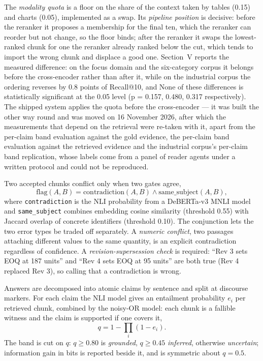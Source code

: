 \documentclass[conference]{IEEEtran}
\begin{document}
The \emph{modality quota} is a floor on the share of the context taken by
tables (0.15) and charts (0.05), implemented as a swap. Its
\emph{pipeline position} is decisive: before the reranker it proposes a
membership for the final ten, which the reranker can reorder but not change,
so the floor binds; after the reranker it swaps the lowest-ranked chunk for
one the reranker already ranked below the cut, which tends to import the
wrong chunk and displace a good one. Section~V reports the measured
difference: on the focus domain and the six-category corpus it belongs before the cross-encoder rather than after it, while on the industrial corpus the ordering reverses by 0.8 points of Recall@10, and
None of these differences is statistically significant at the 0.05 level (p = 0.157, 0.480, 0.317 respectively). The
shipped system applies the quota before the cross-encoder --- it was built
the other way round and was moved on 16 November 2026, after which
the measurements that depend on the retrieval were re-taken with it, apart from the per-claim band evaluation against the gold evidence, the per-claim band evaluation against the retrieved evidence and the industrial corpus's per-claim band replication, whose labels come from a panel of reader agents under a written protocol and could not be reproduced.

Two accepted chunks conflict only when two gates agree,
\begin{equation}
\mathrm{flag}(A,B)=\mathrm{contradiction}(A,B)\wedge\mathrm{same\_subject}(A,B),
\label{eq:flag}
\end{equation}
where \texttt{contradiction} is the NLI probability from a DeBERTa-v3 MNLI
model and \texttt{same\_subject} combines embedding cosine similarity
(threshold 0.55) with Jaccard overlap of concrete identifiers (threshold
0.10). The conjunction lets the two error types be traded off separately. A
\emph{numeric conflict}, two passages attaching different values to the same
quantity, is an explicit contradiction regardless of confidence. A
\emph{revision-supersession check} is required: ``Rev 3 sets EOQ at 187 units''
and ``Rev 4 sets EOQ at 95 units'' are both true (Rev 4 replaced Rev 3), so
calling that a contradiction is wrong.

Answers are decomposed into atomic claims by sentence and split at discourse
markers. For each claim the NLI model gives an entailment probability $e_i$
per retrieved chunk, combined by the noisy-OR model: each chunk is a fallible
witness and the claim is supported if one covers it,
\begin{equation}
q = 1-\prod_i (1-e_i).
\label{eq:noisyor}
\end{equation}
The band is cut on $q$: $q\geq0.80$ is \emph{grounded}, $q\geq0.45$
\emph{inferred}, otherwise \emph{uncertain}; information gain in bits is
reported beside it, and is symmetric about $q=0.5$.
\end{document}
